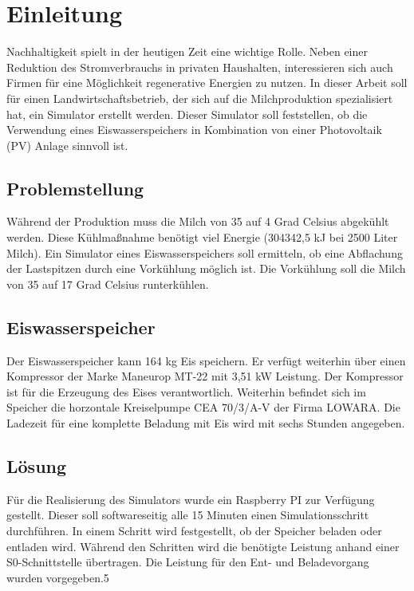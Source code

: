 \chapter{Einleitung}
Nachhaltigkeit spielt in der heutigen Zeit eine wichtige Rolle. Neben einer Reduktion des Stromverbrauchs in privaten Haushalten, interessieren sich auch Firmen für eine Möglichkeit regenerative Energien zu nutzen. In dieser Arbeit soll für einen Landwirtschaftsbetrieb, der sich auf die Milchproduktion spezialisiert hat, ein Simulator erstellt werden. Dieser Simulator soll feststellen, ob die Verwendung eines Eiswasserspeichers in Kombination von einer Photovoltaik (PV) Anlage sinnvoll ist.

\section{Problemstellung}
Während der Produktion muss die Milch von 35 auf 4 Grad Celsius abgekühlt werden. Diese Kühlmaßnahme benötigt viel Energie (304342,5 kJ bei 2500 Liter Milch). Ein Simulator eines Eiswasserspeichers soll ermitteln, ob eine Abflachung der Lastspitzen durch eine Vorkühlung möglich ist. Die Vorkühlung soll die Milch von 35 auf 17 Grad Celsius runterkühlen. 

\section{Eiswasserspeicher}
Der Eiswasserspeicher kann 164 kg Eis speichern. Er verfügt weiterhin über einen Kompressor der Marke Maneurop MT-22 mit 3,51 kW Leistung. Der Kompressor ist für die Erzeugung des Eises verantwortlich. Weiterhin befindet sich im Speicher die horzontale Kreiselpumpe CEA 70/3/A-V der Firma LOWARA. Die Ladezeit für eine komplette Beladung mit Eis wird mit sechs Stunden angegeben.

\section{Lösung}
Für die Realisierung des Simulators wurde ein Raspberry PI zur Verfügung gestellt. Dieser soll softwareseitig alle 15 Minuten einen Simulationsschritt durchführen. In einem Schritt wird festgestellt, ob der Speicher beladen oder entladen wird. Während den Schritten wird die benötigte Leistung anhand einer S0-Schnittstelle übertragen. Die Leistung für den Ent- und Beladevorgang wurden vorgegeben.5